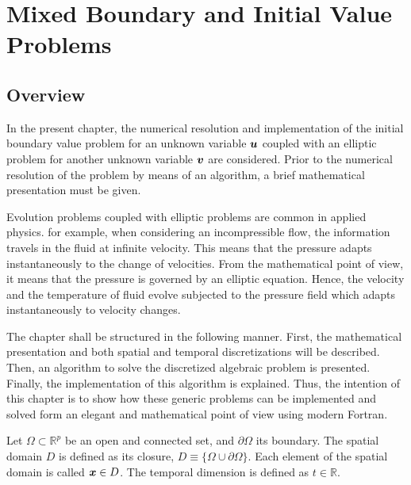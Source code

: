      
\chapter{Mixed Boundary and Initial Value Problems   }\label{Dev:IBVP_BVP}
\section{Overview}
       
In the present chapter, the numerical resolution and implementation of the initial boundary value problem for an unknown variable $\boldsymbol{u}$ coupled with an elliptic problem for another unknown variable $\boldsymbol{v}$ are considered. Prior to the numerical resolution of the problem by means of an algorithm, a brief mathematical presentation must be given. 
        
        
Evolution problems coupled with elliptic problems are common in applied physics. for example, when considering an incompressible flow, the information travels in the fluid at infinite velocity. This means that the pressure adapts instantaneously to the change of velocities. From the mathematical point of view, it means that the pressure is governed by an elliptic equation. Hence, the velocity and the temperature of fluid evolve subjected to the pressure field which adapts instantaneously to velocity changes. 
        
The chapter shall be structured in the following manner. First, the mathematical presentation and both spatial and temporal discretizations will be described. Then, an algorithm to solve the discretized algebraic problem is presented. Finally, the implementation of this algorithm is explained. 
Thus, the intention of this chapter is to show how these generic problems can be implemented and solved form an elegant and mathematical point of view using modern Fortran.
       
       \newpage 
Let $\Omega \subset \mathbb{ R}^p$ be  an open and connected set, and $\partial \Omega$ its boundary. The spatial domain $D$ is defined as its closure, $D \equiv \{\Omega \cup \partial \Omega\}$. Each element of the spatial domain is called  $\boldsymbol{x} \in D $. The temporal dimension is defined as $t \in \mathbb{R} $. 
              
